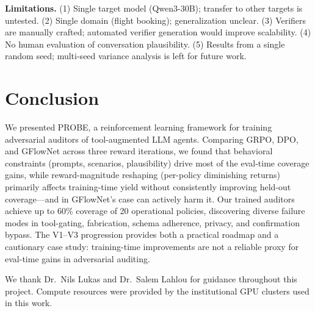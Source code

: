 \documentclass{article}
\begin{document}
\textbf{Limitations.}
(1) Single target model (Qwen3-30B); transfer to other targets is untested.
(2) Single domain (flight booking); generalization unclear.
(3) Verifiers are manually crafted; automated verifier generation would improve scalability.
(4) No human evaluation of conversation plausibility.
(5) Results from a single random seed; multi-seed variance analysis is left for future work.

\section{Conclusion}
\label{sec:conclusion}

We presented PROBE, a reinforcement learning framework for training adversarial auditors of tool-augmented LLM agents. Comparing GRPO, DPO, and GFlowNet across three reward iterations, we found that behavioral constraints (prompts, scenarios, plausibility) drive most of the eval-time coverage gains, while reward-magnitude reshaping (per-policy diminishing returns) primarily affects training-time yield without consistently improving held-out coverage---and in GFlowNet's case can actively harm it. Our trained auditors achieve up to 60\% coverage of 20 operational policies, discovering diverse failure modes in tool-gating, fabrication, schema adherence, privacy, and confirmation bypass. The V1--V3 progression provides both a practical roadmap and a cautionary case study: training-time improvements are not a reliable proxy for eval-time gains in adversarial auditing.

\begin{ack}
We thank Dr.\ Nils Lukas and Dr.\ Salem Lahlou for guidance throughout this project. Compute resources were provided by the institutional GPU clusters used in this work.
\end{ack}




\newpage

\end{document}
